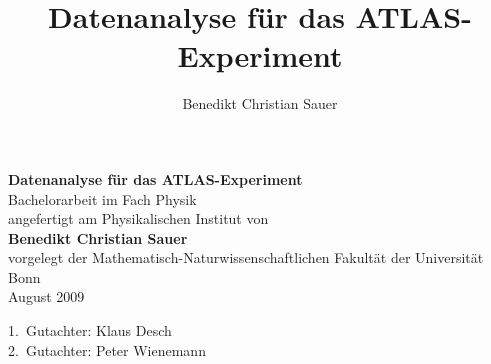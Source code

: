 \documentclass[a4paper,twoside]{scrartcl}
\author{Benedikt Christian Sauer}
\title{Datenanalyse für das ATLAS-Experiment}
\begin{document}
\begin{titlepage}
  \begin{center}
    \vspace{12cm}
    \Huge{\bf\textsf{Datenanalyse für das ATLAS-Experiment}} \\
    \vspace{2cm}
    \Large Bachelorarbeit im Fach Physik \\
    \vspace{1cm}
    \normalsize angefertigt am Physikalischen Institut von \\
    \vspace{1cm}
    \large{\bf Benedikt Christian Sauer} \\
    \vspace{2cm}
    \normalsize vorgelegt der Mathematisch-Naturwissenschaftlichen Fakultät der Universität
    Bonn \\
    \vspace{1cm}
    \large August 2009
  \end{center}
\end{titlepage}
\newpage
\tableofcontents
\vspace{4cm}
\begin{center}
  \large 1.\ Gutachter: Klaus Desch \\
  \large 2.\ Gutachter: Peter Wienemann
\end{center}
\newpage




\end{document}
